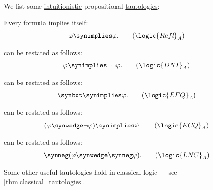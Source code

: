 \begin{proposition}\label{thm:intuitionistic_tautologies}
  We list some \hyperref[def:truth_value_algebra/intuitionistic]{intuitionistic} propositional \hyperref[def:tautology]{tautologies}:
  \begin{thmenum}
     Every formula implies itself:
    \begin{equation}\label{eq:thm:intuitionistic_tautologies/self}
      \varphi \synimplies \varphi. \tag{\ensuremath{ \logic{Refl}_A }}
    \end{equation}

      can be restated as follows:
    \begin{equation}\label{eq:thm:intuitionistic_tautologies/dni}
      \varphi \synimplies \neg \neg \varphi. \tag{\ensuremath{ \logic{DNI}_A }}
    \end{equation}

      can be restated as follows:
    \begin{equation}\label{eq:thm:intuitionistic_tautologies/efq}
      \synbot \synimplies \varphi. \tag{\ensuremath{ \logic{EFQ}_A }}
    \end{equation}

      can be restated as follows:
    \begin{equation}\label{eq:thm:intuitionistic_tautologies/ecq}
      (\varphi \synwedge \neg \varphi) \synimplies \psi. \tag{\ensuremath{ \logic{ECQ}_A }}
    \end{equation}

      can be restated as follows:
    \begin{equation}\label{eq:thm:intuitionistic_tautologies/lnc}
      \synneg (\varphi \synwedge \synneg \varphi). \tag{\ensuremath{ \logic{LNC}_A }}
    \end{equation}
  \end{thmenum}
\end{proposition}
\begin{comments}
  \item Some other useful tautologies hold in classical logic --- see \cref{thm:classical_tautologies}.
\end{comments}
